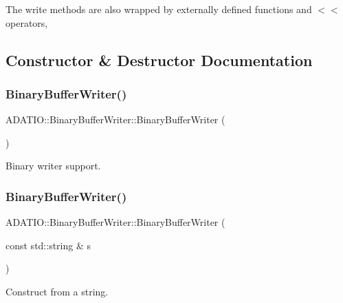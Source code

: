 The write methods are also wrapped by externally defined functions and $<$$<$ operators, 

\subsection{Constructor \& Destructor Documentation}
\mbox{\label{classADATIO_1_1BinaryBufferWriter_a3812e6b5808e6349bae019f79d78094a}} 
\subsubsection{\texorpdfstring{BinaryBufferWriter()}{BinaryBufferWriter()}\hspace{0.1cm}{\footnotesize\ttfamily [1/4]}}
{\footnotesize\ttfamily A\+D\+A\+T\+I\+O\+::\+Binary\+Buffer\+Writer\+::\+Binary\+Buffer\+Writer (\begin{DoxyParamCaption}{ }\end{DoxyParamCaption})}



Binary writer support. 

\mbox{\label{classADATIO_1_1BinaryBufferWriter_acdbd4afbd1fde21aff3ad80d3c67a43c}} 
\subsubsection{\texorpdfstring{BinaryBufferWriter()}{BinaryBufferWriter()}\hspace{0.1cm}{\footnotesize\ttfamily [2/4]}}
{\footnotesize\ttfamily A\+D\+A\+T\+I\+O\+::\+Binary\+Buffer\+Writer\+::\+Binary\+Buffer\+Writer (\begin{DoxyParamCaption}\item[{const std\+::string \&}]{s }\end{DoxyParamCaption})\hspace{0.3cm}{\ttfamily [explicit]}}



Construct from a string. 

